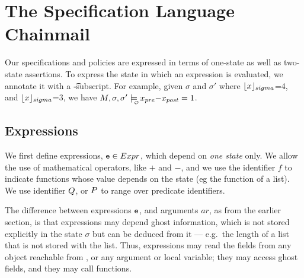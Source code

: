\section{The Specification Language Chainmail}
 \label{sec:SpecLan}

Our specifications and policies are expressed in terms of one-state as well as two-state
assertions. To express the state in which an expression is evaluated, we annotate it with a \t-subscript. For example, given $\sigma$ and $\sigma'$ where ${\lfloor{ {x}}\rfloor_{sigma}}$={4},  and ${\lfloor{ {x}}\rfloor_{sigma}}$={3}, we have  $\M,\sigma,\sigma' \modelsWithO x\pre {-} x\post = 1$.

\subsection{Expressions} We first define expressions, ${{\textrm{\ttfamily{e}}}}\in{Expr}$,
which depend on  {\em one state} only.
We allow the use of mathematical operators, like $+$
and $-$, and we use the identifier  $\mathit{f}$    to indicate
functions whose value depends on the state (eg the function
 of a list). We use  identifier  ${Q}$, or   ${P}$  to
range over {predicate  identifiers}.

The difference between expressions ${{\textrm{\ttfamily{e}}}}$, and arguments $\mathit{ar}$, as from
the earlier section, is that
expressions may depend  ghost information, which is not
stored explicitly in the state $\sigma$
but can be deduced from it ---  e.g.\ the length of a list
that is not stored with the list. {Thus, expressions may read the fields from
any object reachable from , or
any argument or local variable; they may access ghost fields, and they may call functions.}


